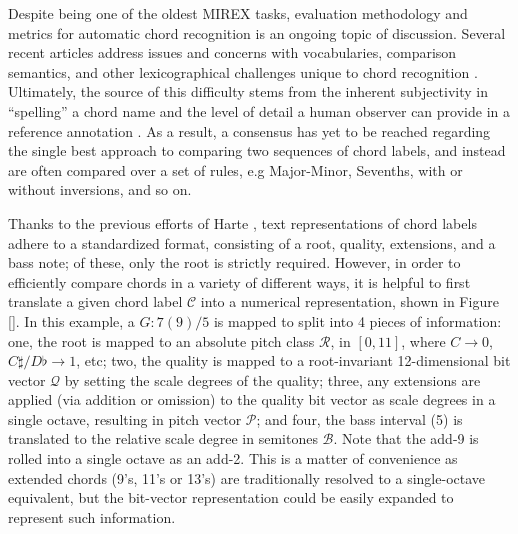 \documentclass{article}
\begin{document}
Despite being one of the oldest MIREX tasks, evaluation methodology and metrics for automatic chord recognition is an ongoing topic of discussion.
Several recent articles address issues and concerns with vocabularies, comparison semantics, and other lexicographical challenges unique to chord recognition \cite{}.
Ultimately, the source of this difficulty stems from the inherent subjectivity in ``spelling'' a chord name and the level of detail a human observer can provide in a reference annotation \cite{McVicar}.
As a result, a consensus has yet to be reached regarding the single best approach to comparing two sequences of chord labels, and instead are often compared over a set of rules, e.g Major-Minor, Sevenths, with or without inversions, and so on.

Thanks to the previous efforts of Harte \cite{}, text representations of chord labels adhere to a standardized format, consisting of a root, quality, extensions, and a bass note; of these, only the root is strictly required.
However, in order to efficiently compare chords in a variety of different ways, it is helpful to first translate a given chord label $\mathcal{C}$ into a numerical representation, shown in Figure \ref{}.
In this example, a $G:7(9)/5$ is mapped to split into 4 pieces of information: one, the root is mapped to an absolute pitch class $\mathcal{R}$, in $[0, 11]$, where $C\to0$, $C\sharp/D\flat\to1$, etc; two, the quality is mapped to a root-invariant 12-dimensional bit vector $\mathcal{Q}$ by setting the scale degrees of the quality; three, any extensions are applied (via addition or omission) to the quality bit vector as scale degrees in a single octave, resulting in pitch vector $\mathcal{P}$; and four, the bass interval (5) is translated to the relative scale degree in semitones $\mathcal{B}$.
Note that the add-9 is rolled into a single octave as an add-2.
This is a matter of convenience as extended chords (9's, 11's or 13's) are traditionally resolved to a single-octave equivalent, but the bit-vector representation could be easily expanded to represent such information.
\end{document}
